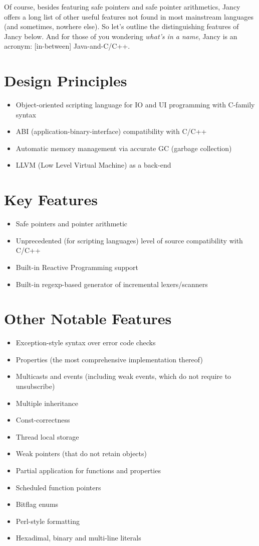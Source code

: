 \documentclass[oneside]{book}
\begin{document}
Of course, besides featuring safe pointers and safe pointer arithmetics, Jancy offers a long list of other useful features not found in most mainstream languages (and sometimes, nowhere else). So let's outline the distinguishing features of Jancy below. And for those of you wondering \emph{what's in a name}, Jancy is an acronym: [in-between] Java-and-C/C++.

\section{Design Principles}

\begin{itemize}
\item Object-oriented scripting language for IO and UI programming with C-family syntax
\item ABI (application-binary-interface) compatibility with C/C++
\item Automatic memory management via accurate GC (garbage collection)
\item LLVM (Low Level Virtual Machine) as a back-end
\end{itemize}

\section{Key Features}

\begin{itemize}
\item Safe pointers and pointer arithmetic
\item Unprecedented (for scripting languages) level of source compatibility with C/C++ 
\item Built-in Reactive Programming support
\item Built-in regexp-based generator of incremental lexers/scanners
\end{itemize}

\section{Other Notable Features}

\begin{itemize}
\item Exception-style syntax over error code checks
\item Properties (the most comprehensive implementation thereof)
\item Multicasts and events (including weak events, which do not require to unsubscribe)
\item Multiple inheritance
\item Const-correctness
\item Thread local storage
\item Weak pointers (that do not retain objects)
\item Partial application for functions and properties
\item Scheduled function pointers
\item Bitflag enums
\item Perl-style formatting
\item Hexadimal, binary and multi-line literals
\end{itemize}
\end{document}
